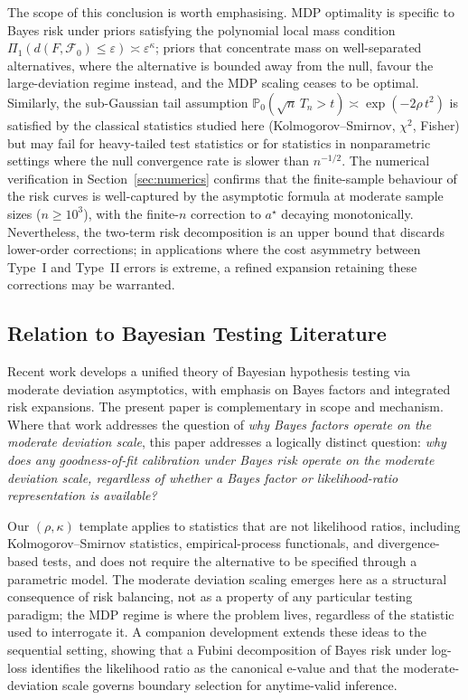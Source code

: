 \documentclass[11pt]{article}
\newcommand{\calF}{\mathcal{F}}
\newcommand{\rhotail}{\rho}  %
\newcommand{\1}{\mathbf{1}}
\newcommand{\PP}{\mathbb{P}}
\theoremstyle{plain}
\theoremstyle{definition}
\theoremstyle{remark}
\begin{document}
The scope of this conclusion is worth emphasising.
MDP optimality is specific to Bayes risk under priors satisfying the polynomial local mass condition $\Pi_1(d(F,\calF_0)\le\varepsilon)\asymp\varepsilon^{\kappa}$; priors that concentrate mass on well-separated alternatives, where the alternative is bounded away from the null, favour the large-deviation regime instead, and the MDP scaling ceases to be optimal.
Similarly, the sub-Gaussian tail assumption $\PP_0(\sqrt{n}\,T_n > t)\asymp\exp(-2\rhotail\,t^2)$ is satisfied by the classical statistics studied here (Kolmogorov--Smirnov, $\chi^2$, Fisher) but may fail for heavy-tailed test statistics or for statistics in nonparametric settings where the null convergence rate is slower than $n^{-1/2}$.
The numerical verification in Section~\ref{sec:numerics} confirms that the finite-sample behaviour of the risk curves is well-captured by the asymptotic formula at moderate sample sizes ($n\ge 10^3$), with the finite-$n$ correction to $a^{\star}$ decaying monotonically.
Nevertheless, the two-term risk decomposition is an upper bound that discards lower-order corrections; in applications where the cost asymmetry between Type~I and Type~II errors is extreme, a refined expansion retaining these corrections may be warranted.


\subsection{Relation to Bayesian Testing Literature}

Recent work \citep{DPSZ2026} develops a unified theory of Bayesian hypothesis testing via moderate deviation asymptotics, with emphasis on Bayes factors and integrated risk expansions.
The present paper is complementary in scope and mechanism.
Where that work addresses the question of \emph{why Bayes factors operate on the moderate deviation scale}, this paper addresses a logically distinct question: \emph{why does any goodness-of-fit calibration under Bayes risk operate on the moderate deviation scale, regardless of whether a Bayes factor or likelihood-ratio representation is available?}

Our $(\rhotail,\kappa)$ template applies to statistics that are not likelihood ratios, including Kolmogorov--Smirnov statistics, empirical-process functionals, and divergence-based tests, and does not require the alternative to be specified through a parametric model.
The moderate deviation scaling emerges here as a structural consequence of risk balancing, not as a property of any particular testing paradigm; the MDP regime is where the problem lives, regardless of the statistic used to interrogate it.
A companion development \citep{PSZ2026evalues} extends these ideas to the sequential setting, showing that a Fubini decomposition of Bayes risk under log-loss identifies the likelihood ratio as the canonical e-value and that the moderate-deviation scale governs boundary selection for anytime-valid inference.
\end{document}
